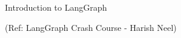 \begin{frame}[fragile]\frametitle{}
\begin{center}
{\Large Introduction to LangGraph}

{\tiny (Ref: LangGraph Crash Course - Harish Neel)}
\end{center}
\end{frame}
